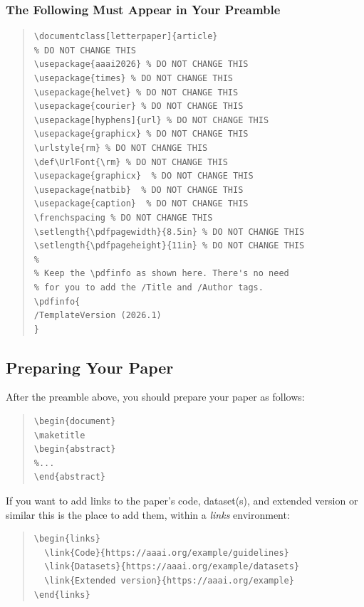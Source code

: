 \documentclass[letterpaper]{article} %
\def\UrlFont{\rm}  %
\begin{document}
\subsubsection{The Following Must Appear in Your Preamble}
\begin{quote}
\begin{scriptsize}\begin{verbatim}
\documentclass[letterpaper]{article}
% DO NOT CHANGE THIS
\usepackage{aaai2026} % DO NOT CHANGE THIS
\usepackage{times} % DO NOT CHANGE THIS
\usepackage{helvet} % DO NOT CHANGE THIS
\usepackage{courier} % DO NOT CHANGE THIS
\usepackage[hyphens]{url} % DO NOT CHANGE THIS
\usepackage{graphicx} % DO NOT CHANGE THIS
\urlstyle{rm} % DO NOT CHANGE THIS
\def\UrlFont{\rm} % DO NOT CHANGE THIS
\usepackage{graphicx}  % DO NOT CHANGE THIS
\usepackage{natbib}  % DO NOT CHANGE THIS
\usepackage{caption}  % DO NOT CHANGE THIS
\frenchspacing % DO NOT CHANGE THIS
\setlength{\pdfpagewidth}{8.5in} % DO NOT CHANGE THIS
\setlength{\pdfpageheight}{11in} % DO NOT CHANGE THIS
%
% Keep the \pdfinfo as shown here. There's no need
% for you to add the /Title and /Author tags.
\pdfinfo{
/TemplateVersion (2026.1)
}
\end{verbatim}\end{scriptsize}
\end{quote}

\subsection{Preparing Your Paper}

After the preamble above, you should prepare your paper as follows:
\begin{quote}
\begin{scriptsize}\begin{verbatim}
\begin{document}
\maketitle
\begin{abstract}
%...
\end{abstract}\end{verbatim}\end{scriptsize}
\end{quote}

\noindent If you want to add links to the paper's code, dataset(s), and extended version or similar this is the place to add them, within a \emph{links} environment:
\begin{quote}%
\begin{scriptsize}\begin{verbatim}
\begin{links}
  \link{Code}{https://aaai.org/example/guidelines}
  \link{Datasets}{https://aaai.org/example/datasets}
  \link{Extended version}{https://aaai.org/example}
\end{links}\end{verbatim}\end{scriptsize}
\end{quote}
\end{document}
